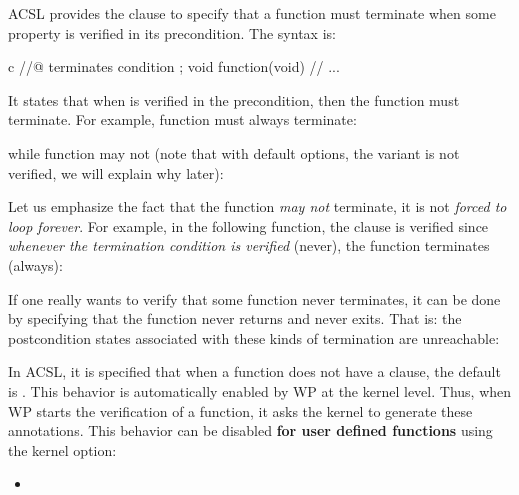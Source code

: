 ACSL provides the  clause to specify that a function must
terminate when some property is verified in its precondition. The syntax is:


\begin{CodeBlock}{c}
//@ terminates condition ;
void function(void){
  // ...
}
\end{CodeBlock}


It states that when  is verified in the precondition, then
the function must terminate. For example, function  must always
terminate:




while function  may not (note that with default options,
the variant is not verified, we will explain why later):




Let us emphasize the fact that the function {\em may not} terminate, it is
not {\em forced to loop forever}. For example, in the following function, the
 clause is verified since
{\em whenever the termination condition is verified} (never), the function
terminates (always):




\begin{Information}
  If one really wants to verify that some function never terminates, it can be
  done by specifying that the function never returns and never exits. That is:
  the postcondition states associated with these kinds of termination are
  unreachable:
\end{Information}


\begin{Information}
  In ACSL, it is specified that when a function does not have a
   clause, the default is
  . This behavior is automatically
  enabled by WP at the kernel level. Thus, when WP starts the verification of
  a function, it asks the kernel to generate these annotations. This behavior
  can be disabled \textbf{for user defined functions} using the kernel option:
  \begin{itemize}
    \item {}
  \end{itemize}
\end{Information}


